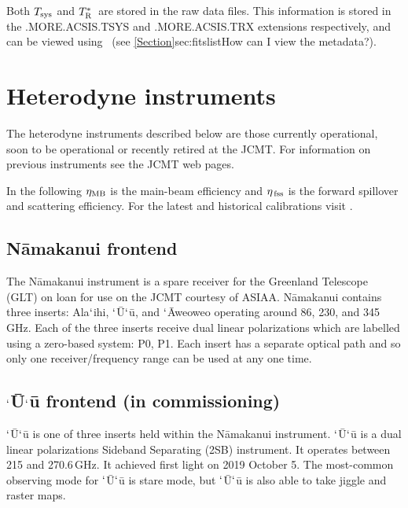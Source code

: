 \documentclass[11pt,oneside,chapters]{starlink}
\newcommand{\trs}{$T_{\textnormal{R}}^{*}$}
\begin{document}
\begin{tip}
Both $T_{\textnormal{sys}}$ and \trs\ are stored in
the raw data files. This information is stored in the .MORE.ACSIS.TSYS
and .MORE.ACSIS.TRX extensions respectively, and can be viewed using
\HDSTRACE\ (see \cref{Section}{sec:fitslist}{How can I view the
metadata?}).
\end{tip}


\section{Heterodyne instruments}
\label{sec:instruments}

The heterodyne instruments described below are those currently operational,
soon to be operational or recently retired at the JCMT.
For information on previous instruments see the JCMT web pages.

In the following $\eta_{\textnormal{MB}}$ is the main-beam efficiency and
$\eta_{\textnormal{\,fss}}$ is the forward spillover and scattering efficiency.
For the latest and historical calibrations visit
.



\subsection{N\=amakanui frontend}

The N\=amakanui instrument is a spare receiver for the Greenland
Telescope (GLT) on loan for use on the JCMT courtesy of ASIAA.
N\=amakanui contains three inserts: Ala$`$ihi, $`$\=U$`$\=u, and
$`$\=Aweoweo operating around 86, 230, and 345\,GHz. Each of the three
inserts receive dual linear polarizations which are labelled using a
zero-based system: P0, P1. Each insert has a separate optical path and
so only one receiver/frequency range can be used at any one time.

\subsection{$`$\=U$`$\=u frontend (in commissioning)}

$`$\=U$`$\=u is one of three inserts held within the N\=amakanui
instrument. $`$\=U$`$\=u is a dual linear polarizations Sideband
Separating (2SB) instrument. It operates between 215 and 270.6\,GHz.
It achieved first light on 2019 October 5.  The most-common observing
mode for $`$\=U$`$\=u is stare mode, but $`$\=U$`$\=u is also able to
take jiggle and raster maps.
\end{document}
